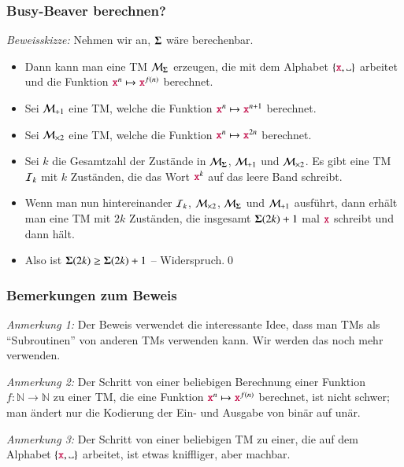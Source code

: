 \documentclass[onlymath]{beamer}
\begin{document}
\begin{frame}\frametitle{Busy-Beaver berechnen?}



\pause
\emph{Beweisskizze:} Nehmen wir an, $\boldsymbol{\Sigma}$ wäre berechenbar.\pause
\begin{itemize}
\item Dann kann man eine TM $\mathcal{M}_{\boldsymbol{\Sigma}}$ erzeugen, die mit dem Alphabet $\{\Sterm{x},\blank\}$ arbeitet und die Funktion $\mathtt{\textcolor{purple}{x}}^n\mapsto\mathtt{\textcolor{purple}{x}}^{f(n)}$ berechnet.\pause
\item Sei $\mathcal{M}_{+1}$ eine TM, welche die Funktion $\mathtt{\textcolor{purple}{x}}^n\mapsto\mathtt{\textcolor{purple}{x}}^{n+1}$ berechnet.\pause
\item Sei $\mathcal{M}_{\times2}$ eine TM, welche die Funktion $\mathtt{\textcolor{purple}{x}}^n\mapsto\mathtt{\textcolor{purple}{x}}^{2n}$ berechnet.\pause
\item Sei $k$ die Gesamtzahl der Zustände in $\mathcal{M}_{\boldsymbol{\Sigma}}$, $\mathcal{M}_{+1}$ und $\mathcal{M}_{\times2}$. Es gibt eine TM $\mathcal{I}_k$ mit $k$ Zuständen, die das Wort $\mathtt{\textcolor{purple}{x}}^k$ auf das leere Band schreibt.\pause
\item Wenn man nun hintereinander $\mathcal{I}_k$, $\mathcal{M}_{\times2}$, $\mathcal{M}_{\boldsymbol{\Sigma}}$ und $\mathcal{M}_{+1}$ ausführt, dann erhält man eine TM mit $2k$ Zuständen, die insgesamt $\boldsymbol{\Sigma}(2k)+1$ mal $\mathtt{\textcolor{purple}{x}}$ schreibt und dann hält.\pause
\item Also ist $\boldsymbol{\Sigma}(2k)\geq\boldsymbol{\Sigma}(2k)+1$ -- Widerspruch.\qed
\end{itemize}


\end{frame}

\begin{frame}\frametitle{Bemerkungen zum Beweis}

\emph{Anmerkung 1:} Der Beweis verwendet die interessante Idee, dass man TMs als "`Subroutinen"' von anderen TMs verwenden kann. Wir werden das noch mehr verwenden.
\bigskip

\emph{Anmerkung 2:} Der Schritt von einer beliebigen Berechnung einer Funktion $f:\mathbb{N}\to\mathbb{N}$ zu einer TM, die eine Funktion $\mathtt{\textcolor{purple}{x}}^n\mapsto \mathtt{\textcolor{purple}{x}}^{f(n)}$ berechnet, ist nicht schwer; man ändert nur die Kodierung der Ein- und Ausgabe von binär auf unär.
\bigskip

\emph{Anmerkung 3:} Der Schritt von einer beliebigen TM zu einer, die auf dem Alphabet $\{\Sterm{x},\blank\}$ arbeitet, ist etwas kniffliger, aber machbar.

\end{frame}
\end{document}
